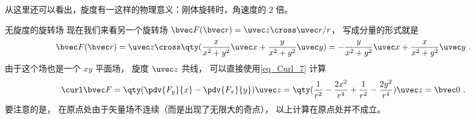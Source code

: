 从这里还可以看出，旋度有一这样的物理意义：刚体旋转时，角速度的 $2$ 倍。

\begin{example}{无旋度的旋转场}
现在我们来看另一个旋转场 $\bvec F(\bvec r) = \uvec z\cross\uvec r /r$， 写成分量的形式就是
\begin{equation}
\bvec F(\bvec r) = \uvec z \cross \qty(\frac{x}{x^2 + y^2}\uvec x + \frac{y}{x^2 + y^2}\uvec y) = -\frac{y}{x^2 + y^2} \uvec x + \frac{x}{x^2 + y^2}\uvec y~.
\end{equation}
由于这个场也是一个 $xy$ 平面场， 旋度 $\uvec z$ 共线， 可以直接使用\autoref{eq_Curl_7} 计算
\begin{equation}
\curl\bvec F = \qty(\pdv{F_y}{x} - \pdv{F_x}{y})\uvec z = \qty(\frac{1}{r^2} - \frac{2x^2}{r^4} + \frac{1}{r^2} - \frac{2y^2}{r^4})\uvec z = \bvec 0~.
\end{equation}
要注意的是， 在原点处由于矢量场不连续（而是出现了无限大的奇点）， 以上计算在原点处并不成立。 
\end{example}
